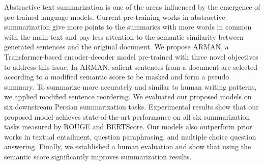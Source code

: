 Abstractive text summarization is one of the areas influenced by the emergence of pre-trained language models. Current pre-training works in abstractive summarization give more points to the summaries with more words in common with the main text and pay less attention to the semantic similarity between generated sentences and the original document. We propose ARMAN, a Transformer-based encoder-decoder model pre-trained with three novel objectives to address this issue. In ARMAN, salient sentences from a document are selected according to a modified semantic score to be masked and form a pseudo summary. To summarize more accurately and similar to human writing patterns, we applied modified sentence reordering. We evaluated our proposed models on six downstream Persian summarization tasks. Experimental results show that our proposed model achieves state-of-the-art performance on all six summarization tasks measured by ROUGE and BERTScore. Our models also outperform prior works in textual entailment, question paraphrasing, and multiple choice question answering. Finally, we established a human evaluation and show that using the semantic score significantly improves summarization results.
